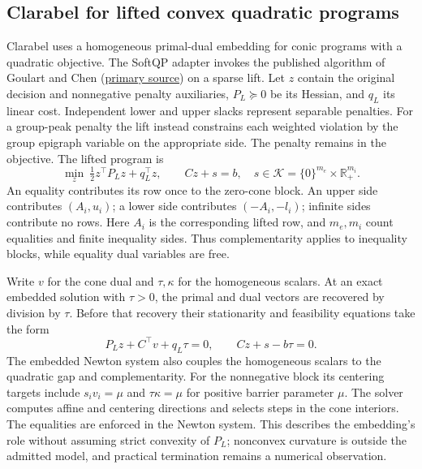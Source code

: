 \subsection{Clarabel for lifted convex quadratic programs}\label{sec:method-clarabel}
Clarabel uses a homogeneous primal-dual embedding for conic programs with
a quadratic objective. The SoftQP adapter invokes the published algorithm
of Goulart and Chen (\href{https://doi.org/10.1007/s12532-026-00320-7}{primary source})
on a sparse lift. Let \(z\) contain the original decision and nonnegative
penalty auxiliaries, \(P_L\succeq0\) be its Hessian, and \(q_L\) its linear
cost. Independent lower and upper slacks represent separable penalties.
For a group-peak penalty the lift instead constrains each weighted
violation by the group epigraph variable on the appropriate side. The
penalty remains in the objective. The lifted program is
\begin{equation}\label{eq:clarabel-cone-form}
 \min_z \ \tfrac12 z^\top P_L z+q_L^\top z,\qquad
 Cz+s=b,\quad s\in\mathcal K=\{0\}^{m_e}\times\mathbb R_+^{m_i}.
\end{equation}
An equality contributes its row once to the zero-cone block. An upper
side contributes \((A_i,u_i)\); a lower side contributes
\((-A_i,-l_i)\); infinite sides contribute no rows. Here \(A_i\) is the
corresponding lifted row, and \(m_e,m_i\) count equalities and finite
inequality sides. Thus complementarity applies to inequality blocks,
while equality dual variables are free.

Write \(v\) for the cone dual and \(\tau,\kappa\) for the homogeneous
scalars. At an exact embedded solution with \(\tau>0\), the primal
and dual vectors are recovered by division by \(\tau\). Before that
recovery their stationarity and feasibility equations take the form
\begin{equation}\label{eq:clarabel-embedded-residual}
 P_Lz+C^\top v+q_L\tau=0,\qquad Cz+s-b\tau=0.
\end{equation}
The embedded Newton system also couples the homogeneous scalars to the
quadratic gap and complementarity. For the nonnegative block its
centering targets include \(s_i v_i=\mu\) and \(\tau\kappa=\mu\) for
positive barrier parameter \(\mu\). The solver computes affine and
centering directions and selects steps in the cone interiors. The
equalities are enforced in the Newton system. This describes the
embedding's role without assuming strict convexity of \(P_L\);
nonconvex curvature is outside the admitted model, and practical
termination remains a numerical observation.


